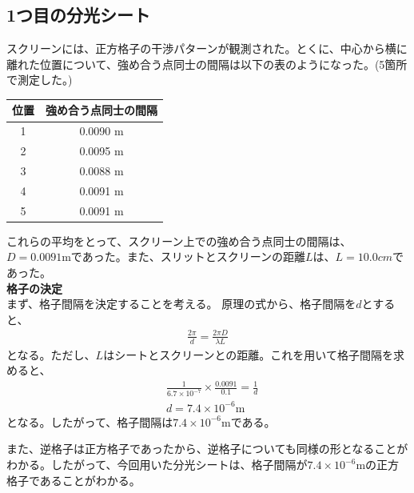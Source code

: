 \documentclass[a4paper,11pt]{jsarticle}
\begin{document}
\subsection{1つ目の分光シート}
スクリーンには、正方格子の干渉パターンが観測された。とくに、中心から横に離れた位置について、強め合う点同士の間隔は以下の表のようになった。(5箇所で測定した。)
\begin{table}[H]
  \centering
  \begin{tabular}{| c | c |}
    \hline
    \textbf{位置} & \textbf{強め合う点同士の間隔} \rule[-5mm]{0mm}{15mm} \\
    \hline
    1 & 0.0090 \si{\meter} \\
    2 & 0.0095 \si{\meter} \\
    3 & 0.0088 \si{\meter} \\
    4 & 0.0091 \si{\meter} \\
    5 & 0.0091 \si{\meter} \\
    \hline
  \end{tabular}
\end{table}
これらの平均をとって、スクリーン上での強め合う点同士の間隔は、$D = 0.0091 \si{\meter}$であった。また、スリットとスクリーンの距離$L$は、$L=10.0 \si{cm}$であった。\\
\textbf{格子の決定}\\
まず、格子間隔を決定することを考える。
原理の式から、格子間隔を$d$とすると、
\begin{align}
  \frac{2\pi}{d} = \frac{2\pi D}{\lambda L}
\end{align}
となる。ただし、$L$はシートとスクリーンとの距離。これを用いて格子間隔を求めると、
\begin{align}
  &\frac{1}{6.7 \times 10^{-7}} \times \frac{0.0091}{0.1} = \frac{1}{d}\\
   &d = 7.4 \times 10^{-6} \si{\meter}
\end{align}
となる。したがって、格子間隔は$7.4 \times 10^{-6} \si{\meter}$である。

また、逆格子は正方格子であったから、逆格子についても同様の形となることがわかる。したがって、今回用いた分光シートは、格子間隔が$7.4 \times 10^{-6} \si{\meter}$の正方格子であることがわかる。
\end{document}
